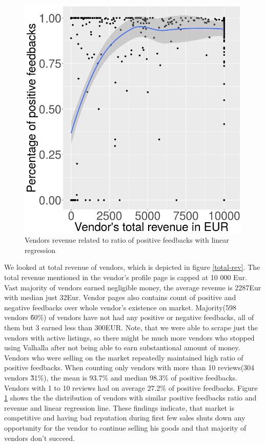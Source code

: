 \documentclass[
  digital, %
  table,   %
  lof,     %
  lot,     %
  oneside
]{fithesis3}
\begin{document}
\begin{figure}[!htb]
    \centering
    \includegraphics[scale=0.4]{posratrev}
    \caption{Vendors revenue related to ratio of positive feedbacks with linear regression}
    \label{posratrev}
\end{figure}

We looked at total revenue of vendors, which is depicted in figure \ref{total-rev}. 
The total revenue mentioned in the vendor's profile page is capped at 10 000 Eur.
Vast majority of vendors earned negligible money,
the average revenue is 2287Eur with median just 32Eur.
Vendor pages also contains count of positive and negative feedbacks over whole vendor's existence
on market. Majority(598 vendors \~ 60\%) of vendors have not had any positive or negative feedbacks, all of them
but 3 earned less than 300EUR.
Note, that we were able to scrape just the vendors with active listings,
so there might be much more vendors who stopped using Valhalla after
not being able to earn substantional amount of money.
Vendors who were selling on the market repeatedly maintained high ratio of positive feedbacks.
When counting only vendors with more than 10 reviews(304 vendors \~ 31\%),
the mean is 93.7\% and median 98.3\% of positive feedbacks.
Vendors with 1 to 10 reviews had on average 27.2\% of positive feedbacks.
Figure \ref{posratrev} shows the the distribution of vendors with similar
positive feedbacks ratio and revenue and linear regression line.
These findings indicate, that market is competitive and
having bad reputation during first few sales shuts down any opportunity
for the vendor to continue selling his goods and that majority of vendors don't succeed.
\end{document}
